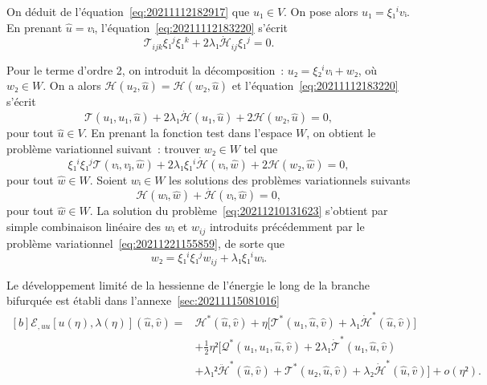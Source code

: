 \documentclass[12pt, final]{amsart}
\begin{document}
On déduit de l'équation~\eqref{eq:20211112182917} que \(u₁∈ V\). On pose
alors \(u₁=ξ₁^i vᵢ\). En prenant \(\hat{u}=vᵢ\),
l'équation~\eqref{eq:20211112183220} s'écrit
\begin{equation}
  𝒯_{ijk}ξ₁^jξ₁^k+2λ₁\dot{ℋ}_{ij}ξ₁^j=0.
\end{equation}

Pour le terme d'ordre 2, on introduit la décomposition~:
\(u₂=ξ₂^ivᵢ+w₂\), où \(w₂∈ W\). On a alors
\(ℋ(u₂, \hat{u})=ℋ(w₂, \hat{u})\) et
l'équation~\eqref{eq:20211112183220} s'écrit
\begin{equation}
  𝒯(u₁, u₁, \hat{u})+2λ₁\dot{ℋ}(u₁, \hat{u})
  +2ℋ(w₂, \hat{u})=0,
\end{equation}
pour tout \(\hat{u}∈ V\). En prenant la fonction test dans l'espace \(W\), on
obtient le problème variationnel suivant~: trouver \(w₂∈ W\) tel
que
\begin{equation}
  \label{eq:20211210131623}
  ξ₁^iξ₁^j𝒯(vᵢ, vⱼ, \hat{w})
  +2λ₁ξ₁^i\dot{ℋ}(vᵢ, \hat{w})
  +2ℋ(w₂, \hat{w})=0,
\end{equation}
pour tout \(\hat{w}∈ W\). Soient \(wᵢ∈ W\) les solutions des problèmes
variationnels suivants
\begin{equation}
  ℋ(wᵢ, \hat{w})+\dot{ℋ}(vᵢ, \hat{w})=0,
\end{equation}
pour tout \(\hat{w}∈ W\). La solution du problème~\eqref{eq:20211210131623}
s'obtient par simple combinaison linéaire des \(wᵢ\) et \(w_{ij}\) introduits
précédemment par le problème variationnel~\eqref{eq:20211221155859}, de sorte
que
\begin{equation}
  w₂=ξ₁^iξ₁^jw_{ij}+λ₁ξ₁^i wᵢ.
\end{equation}

Le développement limité de la hessienne de l'énergie le long de la
branche bifurquée est établi dans l'annexe~\ref{sec:20211115081016}
\begin{equation}
  \label{eq:20211115082025}
  \begin{aligned}[b]
    ℰ_{,uu}[u(η), λ(η)](\hat{u}, \hat{v})
    ={}&ℋ^*(\hat{u}, \hat{v})
    +η\bigl[𝒯^*(u₁, \hat{u}, \hat{v})
    +λ₁\dot{ℋ}^*(\hat{u}, \hat{v})\bigr]\\
    &+\tfrac12η²\bigl[𝒬^*(u₁, u₁, \hat{u}, \hat{v})
    +2λ₁\dot{𝒯}^*(u₁, \hat{u}, \hat{v})\\
    &+λ₁²\ddot{ℋ}^*(\hat{u}, \hat{v})
    +𝒯^*(u₂, \hat{u}, \hat{v})
    +λ₂\dot{ℋ}^*(\hat{u}, \hat{v})\bigr]+o(η²).
  \end{aligned}
\end{equation}
\end{document}
